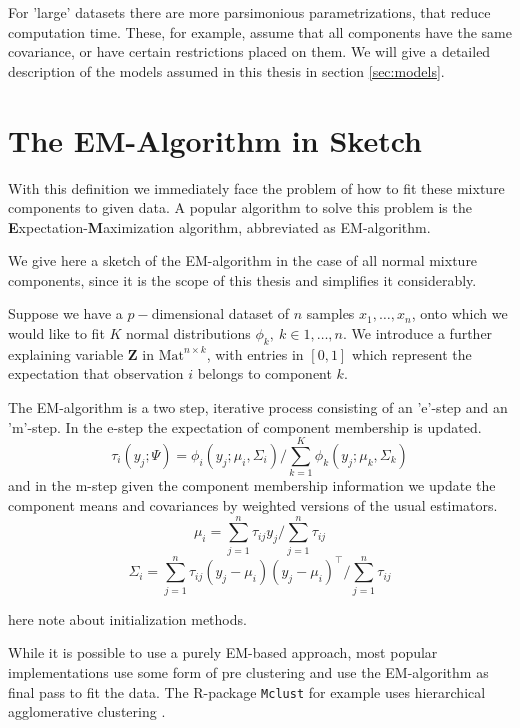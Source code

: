 For 'large' datasets there are more parsimonious parametrizations, that reduce
computation time. These, for example, assume that all components have the same
covariance, or have certain restrictions placed on them. We will give a 
detailed description of the models assumed in this thesis in section 
\ref{sec:models}.


\section{The EM-Algorithm in Sketch}

With this definition we immediately face the problem of how to fit these
mixture components to given data. A popular algorithm to solve this problem 
is the {\bf E}xpectation-{\bf M}aximization algorithm, abbreviated as 
EM-algorithm.

We give here a sketch of the EM-algorithm in the case of all normal mixture 
components, since it is the scope of this thesis and simplifies it 
considerably. %

Suppose we have a $p-$dimensional dataset of $n$ samples $x_1, \dots ,x_n$,
onto which we would like to fit $K$ normal distributions 
$\phi_k,\ k \in {1,\dots , n}$. 
We introduce a further explaining variable $\pmb{Z}$ in 
$\textrm{Mat}^{n\times k}$, with entries in $[0,1]$ which represent the 
expectation that observation $i$ belongs to component $k$.

The EM-algorithm is a two step, iterative process consisting of an 'e'-step
and an 'm'-step.
In the e-step the expectation of component membership is updated.
\[ \tau_i(y_j;\Psi) = \phi_i(y_j;\mu_i, \Sigma_i)/ \sum_{k=1}^K \phi_k(y_j;
    \mu_k, \Sigma_k)\]
and in the m-step given the component membership information we update the 
component means and covariances by weighted versions of the usual estimators.
\[\mu_i = \sum_{j=1}^n \tau_{ij}y_j / \sum_{j=1}^n \tau_{ij}\]
\[\Sigma_i = \sum_{j=1}^n \tau_{ij} (y_j- \mu_i)(y_j-\mu_i)^\top / 
    \sum_{j=1}^n \tau_{ij}\]

here note about initialization methods.

While it is possible to use a purely EM-based approach, most popular 
implementations use some form of pre clustering and use the EM-algorithm as
final pass to fit the data. The R-package {\tt Mclust} for example uses 
hierarchical agglomerative clustering \cite{Scr16}.



